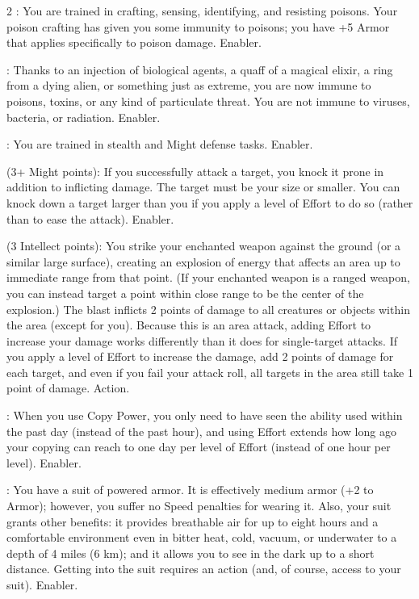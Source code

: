 \begin{multicols}{2}
: You are trained in crafting, sensing, identifying, and resisting poisons. Your poison crafting has given you some immunity to poisons; you have +5 Armor that applies specifically to poison damage. Enabler. 
 
: Thanks to an injection of biological agents, a quaff of a magical elixir, a ring from a dying alien, or something just as extreme, you are now immune to poisons, toxins, or any kind of particulate threat. You are not immune to viruses, bacteria, or radiation. Enabler. 
 
: You are trained in stealth and Might defense tasks. Enabler. 
 
 (3+ Might points): If you successfully attack a target, you knock it prone in addition to inflicting damage. The target must be your size or smaller. You can knock down a target larger than you if you apply a level of Effort to do so (rather than to ease the attack). Enabler. 

 (3 Intellect points): You strike your enchanted weapon against the ground (or a similar large surface), creating an explosion of energy that affects an area up to immediate range from that point. (If your enchanted weapon is a ranged weapon, you can instead target a point within close range to be the center of the explosion.) The blast inflicts 2 points of damage to all creatures or objects within the area (except for you). Because this is an area attack, adding Effort to increase your damage works differently than it does for single-target attacks. If you apply a level of Effort to increase the damage, add 2 points of damage for each target, and even if you fail your attack roll, all targets in the area still take 1 point of damage. Action.

: When you use Copy Power, you only need to have seen the ability used within the past day (instead of the past hour), and using Effort extends how long ago your copying can reach to one day per level of Effort (instead of one hour per level). Enabler.

: You have a suit of powered armor. It is effectively medium armor (+2 to Armor); however, you suffer no Speed penalties for wearing it. Also, your suit grants other benefits: it provides breathable air for up to eight hours and a comfortable environment even in bitter heat, cold, vacuum, or underwater to a depth of 4 miles (6 km); and it allows you to see in the dark up to a short distance. Getting into the suit requires an action (and, of course, access to your suit). Enabler.
 

\end{multicols}
